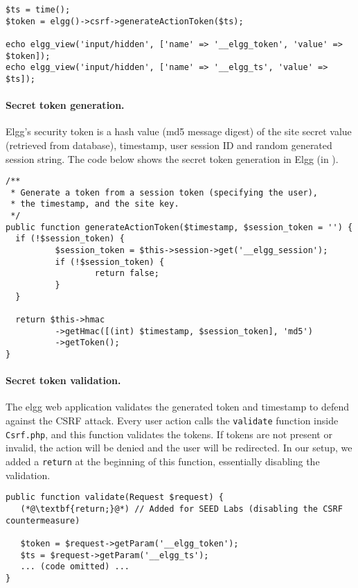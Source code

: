 \begin{lstlisting}
$ts = time();
$token = elgg()->csrf->generateActionToken($ts);

echo elgg_view('input/hidden', ['name' => '__elgg_token', 'value' => $token]);
echo elgg_view('input/hidden', ['name' => '__elgg_ts', 'value' => $ts]);
\end{lstlisting}


\paragraph{Secret token generation.}
Elgg's security token is a hash value (md5 message digest) of the site 
secret value (retrieved from database),
timestamp, user session ID and random generated session string. 
The code below shows the secret token generation in Elgg 
(in ).


\begin{lstlisting}
/**
 * Generate a token from a session token (specifying the user), 
 * the timestamp, and the site key.
 */
public function generateActionToken($timestamp, $session_token = '') {
  if (!$session_token) {
          $session_token = $this->session->get('__elgg_session');
          if (!$session_token) {
                  return false;
          }
  }

  return $this->hmac
          ->getHmac([(int) $timestamp, $session_token], 'md5')
          ->getToken();
}
\end{lstlisting}


\paragraph{Secret token validation.}
The elgg web application validates the generated token and timestamp to
defend against the CSRF attack.  Every user action calls the 
\texttt{validate} function inside \texttt{Csrf.php}, and this function validates the tokens.
If tokens are not present or invalid, the action will be denied and the
user will be redirected. In our setup, we added 
a \texttt{return} at the beginning of this function, essentially
disabling the validation.

\begin{lstlisting}
public function validate(Request $request) {
   (*@\textbf{return;}@*) // Added for SEED Labs (disabling the CSRF countermeasure)

   $token = $request->getParam('__elgg_token');
   $ts = $request->getParam('__elgg_ts');
   ... (code omitted) ...
}
\end{lstlisting}



